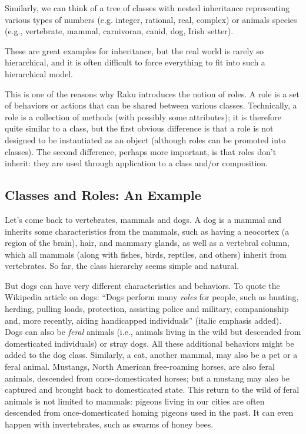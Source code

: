    
  
 
Similarly, we can think of a tree of classes with nested 
inheritance representing various types of numbers (e.g. integer, 
rational, real, complex) or animals species (e.g., vertebrate, 
mammal, carnivoran, canid, dog, Irish setter).

These are great examples for inheritance, but the real world is 
rarely so hierarchical, and it is often difficult to force 
everything to fit into such a hierarchical model.

This is one of the reasons why Raku introduces the notion of 
roles. A role is a set of behaviors or actions that can be shared 
between various classes. Technically, a role is a collection 
of methods (with possibly some attributes); it is therefore 
quite similar to a class, but the first obvious difference 
is that a role is not designed to be instantiated as an object 
(although roles can be promoted into classes). The 
second difference, perhaps more important, is that roles 
don't inherit: they are used through application to a class 
and/or composition.

\subsection{Classes and Roles: An Example}

  
Let's come back to vertebrates, mammals and dogs. A dog is 
a mammal and inherits some characteristics from the mammals, 
such as having a neocortex (a region of the brain), hair, 
and mammary glands, as well as a vertebral column, which 
all mammals (along with fishes, birds, reptiles, and others) 
inherit from vertebrates. So far, the class hierarchy seems 
simple and natural.

But dogs can have very different characteristics and behaviors.
To quote the Wikipedia article on dogs: ``Dogs perform many 
\emph{roles} for people, such as hunting, herding, pulling 
loads, protection, assisting police and military, companionship 
and, more recently, aiding handicapped individuals'' (italic emphasis 
added). Dogs can also be \emph{feral} animals 
(i.e., animals living in the wild but 
descended from domesticated individuals) or stray dogs. All 
these additional behaviors might be added to the dog class. 
Similarly, a cat, another mammal, may also be a pet 
or a feral animal. Mustangs, North American free-roaming horses, 
are also feral animals, descended from once-domesticated horses; 
but a mustang may also be captured and brought back to 
domesticated state. This return to the wild of feral animals 
is not limited to mammals: pigeons living in our cities are 
often descended from once-domesticated homing pigeons used 
in the past. It can even happen with invertebrates, such 
as swarms of honey bees.

